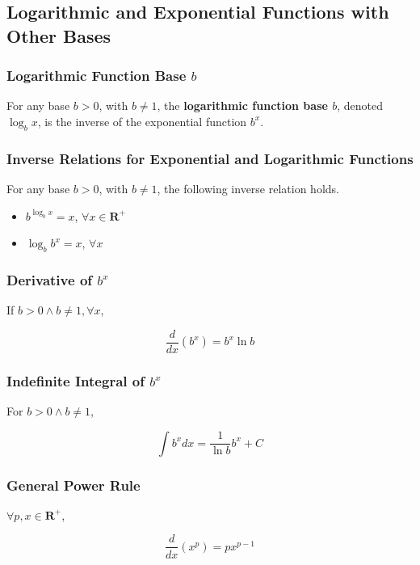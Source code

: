 \subsection{Logarithmic and Exponential Functions with Other Bases}
\subsubsection{Logarithmic Function Base $b$}
For any base $b > 0$, with $b \neq 1$, the \textbf{logarithmic function base $b$}, denoted $\log_b x$, is the inverse of the exponential function $b^x$.

\subsubsection{Inverse Relations for Exponential and Logarithmic Functions}
For any base $b > 0$, with $b \neq 1$, the following inverse relation holds.
\begin{itemize}
\item $b^{\log_b x} = x$, $\forall x \in \mathbf{R}^+$
\item $\log _b b^x = x$, $\forall x$
\end{itemize}

\subsubsection{Derivative of $b^x$}
If $b > 0 \wedge b \neq 1, \forall x$,

\begin{equation}
\frac{d}{dx}(b^x) = b^x \ln b
\end{equation}

\subsubsection{Indefinite Integral of $b^x$}
For $b > 0 \wedge b \neq 1$,

\begin{equation}
\int b^x dx = \frac{1}{\ln b}{b^x} + C
\end{equation}

\subsubsection{General Power Rule}
$\forall p, x \in \mathbf{R}^+$,

\begin{equation}
\frac{d}{dx}(x^p) = px^{p - 1}
\end{equation}

